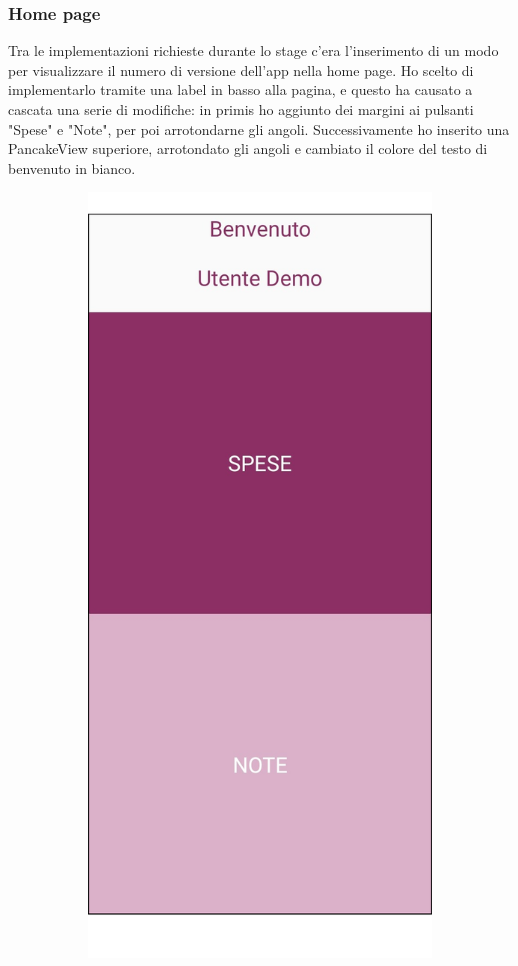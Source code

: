 


\subsubsection{Home page}

Tra le implementazioni richieste durante lo stage c'era l'inserimento di un modo per visualizzare il numero di versione dell'app nella home page. Ho scelto di implementarlo tramite una label in basso alla pagina, e questo ha causato a cascata una serie di modifiche: in primis ho aggiunto dei margini ai pulsanti "Spese" e "Note", per poi arrotondarne gli angoli. Successivamente ho inserito una PancakeView superiore, arrotondato gli angoli e cambiato il colore del testo di benvenuto in bianco.

\begin{figure}[H]
    \begin{subfigure}{.5\textwidth}
        \centering
        \includegraphics[width=.7\columnwidth]{images/screenshot/old/home.png}\vspace{2mm}

\end{subfigure}
\end{figure}
